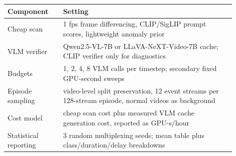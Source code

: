 \begin{tabular}{p{0.22\linewidth}p{0.68\linewidth}}
\toprule
Component & Setting \\
\midrule
Cheap scan & 1 fps frame differencing, CLIP/SigLIP prompt scores, lightweight anomaly prior \\
VLM verifier & Qwen2.5-VL-7B or LLaVA-NeXT-Video-7B cache; CLIP verifier only for diagnostics \\
Budgets & 1, 2, 4, 8 VLM calls per timestep; secondary fixed GPU-second sweeps \\
Episode sampling & video-level split preservation, 12 event streams per 128-stream episode, normal videos as background \\
Cost model & cheap scan cost plus measured VLM cache generation cost, reported as GPU-s/hour \\
Statistical reporting & 3 random multiplexing seeds; mean table plus class/duration/delay breakdowns \\
\bottomrule
\end{tabular}
